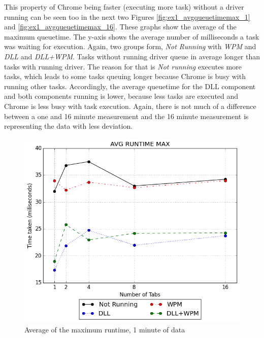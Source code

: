 This property of Chrome being faster (executing more task) without a driver running can be seen too in the next two Figures \ref{fig:ex1_avgqueuetimemax_1} and \ref{fig:ex1_avgqueuetimemax_16}. These graphs show the average of the maximum queuetime. The y-axis shows the average number of milliseconds a task was waiting for execution. Again, two groups form, \emph{Not Running} with \emph{WPM} and \emph{DLL} and \emph{DLL+WPM}. Tasks without running driver queue in average longer than tasks with running driver. The reason for that is \emph{Not running} executes more tasks, which leads to some tasks queuing longer because Chrome is busy with running other tasks. Accordingly, the average queuetime for the DLL component and both components running is lower, because less tasks are executed and Chrome is less busy with task execution. Again, there is not much of a difference between a one and 16 minute measurement and the 16 minute measurement is representing the data with less deviation.
\begin{figure}[!htbp]
	\centering
    \includegraphics[width=\textwidth,keepaspectratio]{Evaluation/experiment1/AVG-RUNTIME-MAX-1.png}
    \caption{Average of the maximum runtime, 1 minute of data}
    \label{fig:ex1_avgruntimemax_1}
\end{figure}
